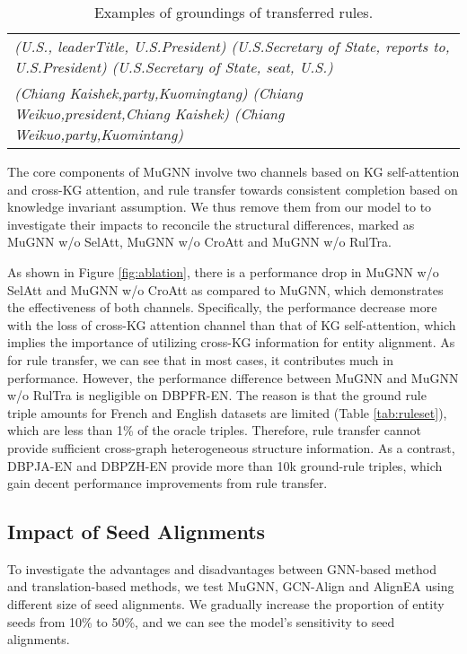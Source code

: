 \documentclass[11pt,a4paper]{article}
\begin{document}
\begin{table*}[htp]
\small
	\centering
	\begin{tabular}{p{15.5cm}}
		\toprule
\emph{(U.S., leaderTitle, U.S.President)  (U.S.Secretary of State, reports to, U.S.President)  (U.S.Secretary of State, seat, U.S.)} \\
		\emph{(Chiang Kaishek,party,Kuomingtang)  (Chiang Weikuo,president,Chiang Kaishek)  (Chiang Weikuo,party,Kuomintang)}                \\
\bottomrule
	\end{tabular}
	\caption{Examples of groundings of transferred rules.}
	\label{tab:gr_rule}
\end{table*}

The core components of MuGNN involve two channels based on KG self-attention and cross-KG attention, and rule transfer towards consistent completion based on knowledge invariant assumption. We thus remove them from our model to to investigate their impacts to reconcile the structural differences, marked as MuGNN w/o SelAtt, MuGNN w/o CroAtt and MuGNN w/o RulTra.

As shown in Figure \ref{fig:ablation}, there is a performance drop in MuGNN w/o SelAtt and MuGNN w/o CroAtt as compared to MuGNN, which demonstrates the effectiveness of both channels. Specifically, the performance decrease more with the loss of cross-KG attention channel than that of KG self-attention, which implies the importance of utilizing cross-KG information for entity alignment. As for rule transfer, we can see that in most cases, it contributes much in performance. However, the performance difference between MuGNN and MuGNN w/o RulTra is negligible on DBP{\tiny FR-EN}. The reason is that the ground rule triple amounts for French and English datasets are limited (Table \ref{tab:ruleset}), which are less than 1\% of the oracle triples. Therefore, rule transfer cannot provide sufficient cross-graph heterogeneous structure information. As a contrast, DBP{\tiny JA-EN} and DBP{\tiny ZH-EN} provide more than 10k ground-rule triples, which gain decent performance improvements from rule transfer.

\subsection{Impact of Seed Alignments}

To investigate the advantages and disadvantages between GNN-based method and translation-based methods, we test MuGNN, GCN-Align and AlignEA using different size of seed alignments. We gradually increase the proportion of entity seeds from 10\% to 50\%, and we can see the model's sensitivity to seed alignments.
\end{document}
